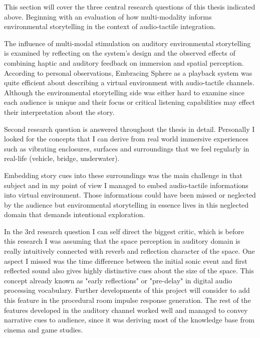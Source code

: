         This section will cover the three central research questions of this thesis indicated above. Beginning with an evaluation of how multi-modality informs environmental storytelling in the context of audio-tactile integration.\par

        The influence of multi-modal stimulation on auditory environmental storytelling is examined by reflecting on the system’s design and the observed effects of combining haptic and auditory feedback on immersion and spatial perception. According to personal observations, Embracing Sphere as a playback system was quite efficient about describing a virtual environment with audio-tactile channels. Although the environmental storytelling side was either hard to examine since each audience is unique and their focus or critical listening capabilities may effect their interpretation about the story.\par

        Second research question is answered throughout the thesis in detail. Personally I looked for the concepts that I can derive from real world immersive experiences such as vibrating enclosures, surfaces and surroundings that we feel regularly in real-life (vehicle, bridge, underwater).\par

        Embedding story cues into these surroundings was the main challenge in that subject and in my point of view I managed to embed audio-tactile informations into virtual environment. Those informations could have been missed or neglected by the audience but environmental storytelling in essence lives in this neglected domain that demands intentional exploration.\par

        In the 3rd research question I can self direct the biggest critic, which is before this research I was assuming that the space perception in auditory domain is really intuitively connected with reverb and reflection character of the space. One aspect I missed was the time difference between the initial sonic event and first reflected sound also gives highly distinctive cues about the size of the space. This concept already known as "early reflections" or "pre-delay" in digital audio processing vocabulary. Further developments of this project will consider to add this feature in the procedural room impulse response generation. The rest of the features developed in the auditory channel worked well and managed to convey narrative cues to audience, since it was deriving most of the knowledge base from cinema and game studies.\par